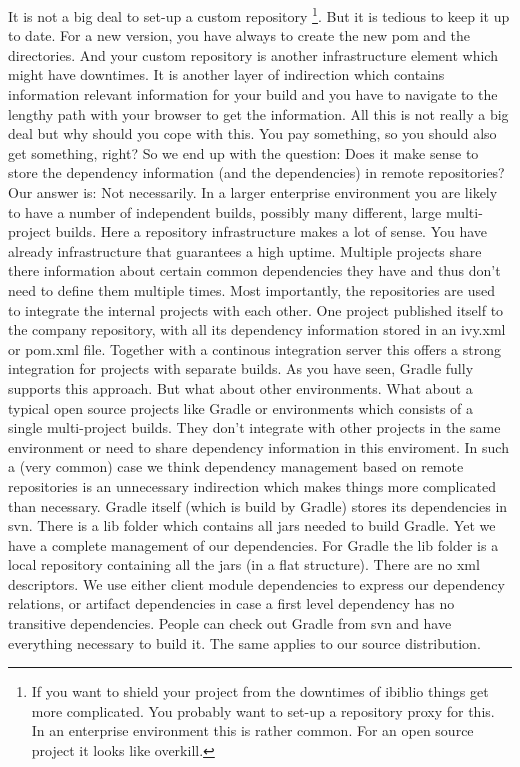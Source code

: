 It is not a big deal to set-up a custom repository \footnote{If you want to shield your project from the downtimes of ibiblio things get more complicated. You probably want to set-up a repository proxy for this. In an enterprise environment this is rather common. For an open source project it looks like overkill.}. But it is tedious to keep it up to date. For a new version, you have always to create the new pom and the directories. And your custom repository is another infrastructure element which might have downtimes. It is another layer of indirection which contains information relevant information for your build and you have to navigate to the lengthy path with your browser to get the information. All this is not really a big deal but why should you cope with this. You pay something, so you should also get something, right? So we end up with the question: Does it make sense to store the dependency information (and the dependencies) in remote repositories? Our answer is: Not necessarily.
In a larger enterprise environment you are likely to have a number of independent builds, possibly many different, large multi-project builds. Here a repository infrastructure makes a lot of sense. You have already infrastructure that guarantees a high uptime. Multiple projects share there information about certain common dependencies they have and thus don't need to define them multiple times. Most importantly, the repositories are used to integrate the internal projects with each other. One project published itself to the company repository, with all its dependency information stored in an ivy.xml or pom.xml file. Together with a continous integration server this offers a strong integration for projects with separate builds. As you have seen, Gradle fully supports this approach.
But what about other environments. What about a typical open source projects like Gradle or environments which consists of a single multi-project builds. They don't integrate with other projects in the same environment or need to share dependency information in this enviroment. In such a (very common) case we think dependency management based on remote repositories is an unnecessary indirection which makes things more complicated than necessary. Gradle itself (which is build by Gradle) stores its dependencies in svn. There is a lib folder which contains all jars needed to build Gradle. Yet we have a complete management of our dependencies. For Gradle the lib folder is a local repository containing all the jars (in a flat structure). There are no xml descriptors. We use either client module dependencies to express our dependency relations, or artifact dependencies in case a first level dependency has no transitive dependencies. People can check out Gradle from svn and have everything necessary to build it. The same applies to our source distribution. 

